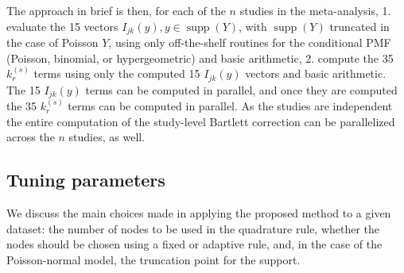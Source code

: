 \documentclass[12pt]{article}
\newcommand{\F}{I}
\newcommand{\Y}{Y}
\newcommand{\y}{y}
\renewcommand{\k}{k}
\newcommand{\kterm}{\k_r^{(s)}}
\newcommand{\n}{n}
\begin{document}
The approach in brief is then, for each of the $\n$ studies in the
meta-analysis, 1. evaluate the 15 vectors
$\F_{jk}(\y), \y\in \operatorname{supp}(\Y)$, with $\operatorname{supp}(\Y)$ truncated in the case of Poisson $\Y$,  using only off-the-shelf routines for
the conditional PMF (Poisson, binomial, or hypergeometric) and basic
arithmetic, 2. compute the 35 $\kterm$ terms using only the computed 15
$\F_{jk}(\y)$ vectors and basic arithmetic. The 15 $\F_{jk}(\y)$ terms can be
computed in parallel, and once they are computed the 35 $\kterm$ terms
can be computed in parallel. As the studies are independent the entire
computation of the study-level Bartlett correction can be parallelized
across the $\n$ studies, as well.


\subsection{Tuning parameters}
\label{sec:method:tuning-parameters}

We discuss the main choices made in applying the proposed method to a
given dataset: the number of nodes to be used in the quadrature rule,
whether the nodes should be chosen using a fixed or adaptive rule,
and, in the case of the Poisson-normal model, the truncation point for
the support.
\end{document}
